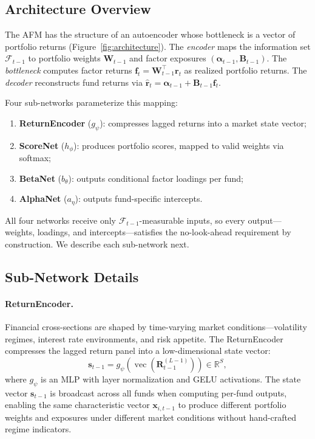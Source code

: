 \subsection{Architecture Overview}\label{sec:architecture}

The AFM has the structure of an autoencoder whose bottleneck is a vector of portfolio returns (Figure~\ref{fig:architecture}). The \emph{encoder} maps the information set $\mathcal{F}_{t-1}$ to portfolio weights $\mathbf{W}_{t-1}$ and factor exposures $(\boldsymbol{\alpha}_{t-1}, \mathbf{B}_{t-1})$. The \emph{bottleneck} computes factor returns $\mathbf{f}_t = \mathbf{W}_{t-1}^\top \mathbf{r}_t$ as realized portfolio returns. The \emph{decoder} reconstructs fund returns via $\hat{\mathbf{r}}_t = \boldsymbol{\alpha}_{t-1} + \mathbf{B}_{t-1} \mathbf{f}_t$.

Four sub-networks parameterize this mapping:
\begin{enumerate}[leftmargin=*,nosep]
    \item \textbf{ReturnEncoder} ($g_\psi$): compresses lagged returns into a market state vector;
    \item \textbf{ScoreNet} ($h_\phi$): produces portfolio scores, mapped to valid weights via softmax;
    \item \textbf{BetaNet} ($b_\theta$): outputs conditional factor loadings per fund;
    \item \textbf{AlphaNet} ($a_\eta$): outputs fund-specific intercepts.
\end{enumerate}
All four networks receive only $\mathcal{F}_{t-1}$-measurable inputs, so every output---weights, loadings, and intercepts---satisfies the no-look-ahead requirement by construction. We describe each sub-network next.


\subsection{Sub-Network Details}\label{sec:subnetworks}

\paragraph{ReturnEncoder.} Financial cross-sections are shaped by time-varying market conditions---volatility regimes, interest rate environments, and risk appetite. The ReturnEncoder compresses the lagged return panel into a low-dimensional state vector:
\begin{equation}\label{eq:return-encoder}
    \mathbf{s}_{t-1} = g_\psi\!\left(\operatorname{vec}\!\left(\mathbf{R}_{t-1}^{(L-1)}\right)\right) \in \mathbb{R}^{S},
\end{equation}
where $g_\psi$ is an MLP with layer normalization and GELU activations. The state vector $\mathbf{s}_{t-1}$ is broadcast across all funds when computing per-fund outputs, enabling the same characteristic vector $\mathbf{x}_{i,t-1}$ to produce different portfolio weights and exposures under different market conditions without hand-crafted regime indicators.

